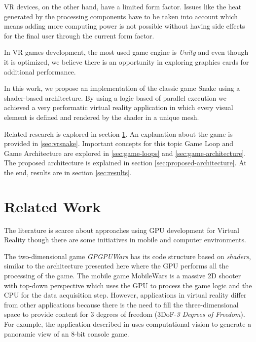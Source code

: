 \documentclass[runningheads]{llncs}
\begin{document}
VR devices, on the other hand, have a limited form factor. Issues like the heat generated by the processing components have to be taken into account which means adding more computing power is not possible without having side effects for the final user through the current form factor.

In VR games development, the most used game engine is \textit{Unity} \cite{Unity} and even though it is optimized, we believe there is an opportunity in exploring graphics cards for additional performance.

In this work, we propose an implementation of the classic game Snake using a shader-based architecture. By using a logic based of parallel execution we achieved a very performatic virtual reality application in which every visual element is defined and rendered by the shader in a unique mesh.

Related research is explored in section \ref{sec:related-works}. An explanation about the game is provided in \ref{sec:vrsnake}. Important concepts for this topic Game Loop and Game Architecture are explored in \ref{sec:game-loops} and \ref{sec:game-architecture}. The proposed architecture is explained in section \ref{sec:proposed-architecture}. At the end, results are in section \ref{sec:results}.


\section{Related Work} \label{sec:related-works}

The literature is scarce about approaches using GPU development for Virtual Reality though there are some initiatives in mobile and computer environments.


The two-dimensional game \textit{GPGPUWars} \cite{joselli2009gpuwars} has its code structure based on \textit{shaders}, similar to the architecture presented here where the GPU performs all the processing of the game. The mobile game MobileWars is a massive 2D shooter with top-down perspective \cite{MobileWars} which uses the GPU to process the game logic and the CPU for the data acquisition step. However, applications in virtual reality differ from other applications because there is the need to fill the three-dimensional space to provide content for 3 degrees of freedom (3DoF-\textit{3 Degrees of Freedom}). For example, the application described in \cite{zund2015unfolding} uses computational vision to generate a panoramic view of an 8-bit console game.
\end{document}
